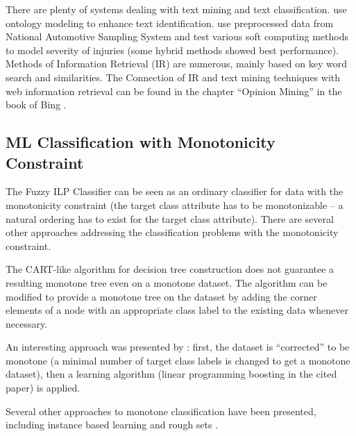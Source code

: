 There are plenty of systems dealing with text mining and text classification. \cite{biblio:ReYaLiOntoText08} use ontology modeling to enhance text identification. \cite{biblio:CAP} use preprocessed data from National Automotive Sampling System and test various soft computing methods to model severity of injuries (some hybrid methods showed best performance). Methods of Information Retrieval (IR) are numerous, mainly based on key word search and similarities. The Connection of IR and text mining techniques with web information retrieval can be found in the chapter ``Opinion Mining'' in the book of Bing \cite{biblio:WebDataMining}. 

\subsection{ML Classification with Monotonicity Constraint}
The Fuzzy ILP Classifier can be seen as an ordinary classifier for data with the monotonicity constraint (the target class attribute has to be monotonizable -- a natural ordering has to exist for the target class attribute). There are several other approaches addressing the classification problems with the monotonicity constraint.

The CART-like algorithm for decision tree construction does not guarantee a resulting monotone tree even on a monotone dataset. The algorithm can be modified \citep{biblio:mon_trees} to provide a monotone tree on the dataset by adding the corner elements of a node with an appropriate class label to the existing data whenever necessary.

An interesting approach was presented by \cite{biblio:mon_transf}: first, the dataset is ``corrected'' to be monotone (a minimal number of target class labels is changed to get a monotone dataset), then a learning algorithm (linear programming boosting in the cited paper) is applied.

Several other approaches to monotone classification have been presented, including instance based learning \citep{biblio:ibl} and rough sets \citep{biblio:rough_sets}.








